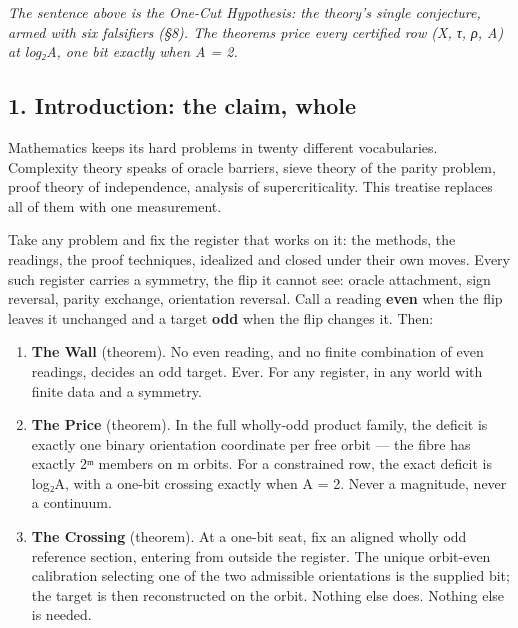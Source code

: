 \documentclass[10pt]{article}
\renewcommand{\_}{\origunderscore\allowbreak}
\providecommand{\tightlist}{\setlength{\itemsep}{0pt}\setlength{\parskip}{0pt}}
\begin{document}
\emph{The sentence above is the One-Cut Hypothesis: the theory's single
conjecture, armed with six falsifiers (§8). The theorems price every
certified row (X, τ, ρ, A) at log₂\textbar A\textbar, one bit exactly
when \textbar A\textbar{} = 2.}

\hypertarget{introduction-the-claim-whole}{%
\subsection{1. Introduction: the claim,
whole}\label{introduction-the-claim-whole}}

Mathematics keeps its hard problems in twenty different vocabularies.
Complexity theory speaks of oracle barriers, sieve theory of the parity
problem, proof theory of independence, analysis of supercriticality.
This treatise replaces all of them with one measurement.

Take any problem and fix the register that works on it: the methods, the
readings, the proof techniques, idealized and closed under their own
moves. Every such register carries a symmetry, the flip it cannot see:
oracle attachment, sign reversal, parity exchange, orientation reversal.
Call a reading \textbf{even} when the flip leaves it unchanged and a
target \textbf{odd} when the flip changes it. Then:

\begin{enumerate}
\def\labelenumi{\arabic{enumi}.}
\tightlist
\item
  \textbf{The Wall} (theorem). No even reading, and no finite
  combination of even readings, decides an odd target. Ever. For any
  register, in any world with finite data and a symmetry.
\item
  \textbf{The Price} (theorem). In the full wholly-odd product family,
  the deficit is exactly one binary orientation coordinate per free
  orbit --- the fibre has exactly 2ᵐ members on m orbits. For a
  constrained row, the exact deficit is log₂\textbar A\textbar, with a
  one-bit crossing exactly when \textbar A\textbar{} = 2. Never a
  magnitude, never a continuum.
\item
  \textbf{The Crossing} (theorem). At a one-bit seat, fix an aligned
  wholly odd reference section, entering from outside the register. The
  unique orbit-even calibration selecting one of the two admissible
  orientations is the supplied bit; the target is then reconstructed on
  the orbit. Nothing else does. Nothing else is needed.
\end{enumerate}
\end{document}
